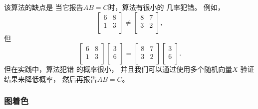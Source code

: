 该算法的缺点是
当它报告$AB=C$时，算法有很小的
几率犯错。
例如，
\[
 \begin{bmatrix}
  6 & 8 \\
  1 & 3 \\
 \end{bmatrix}
\neq
 \begin{bmatrix}
  8 & 7 \\
  3 & 2 \\
 \end{bmatrix},
\]
但
\[
 \begin{bmatrix}
  6 & 8 \\
  1 & 3 \\
 \end{bmatrix}
 \begin{bmatrix}
  3 \\
  6 \\
 \end{bmatrix}
=
 \begin{bmatrix}
  8 & 7 \\
  3 & 2 \\
 \end{bmatrix}
 \begin{bmatrix}
  3 \\
  6 \\
 \end{bmatrix}.
\]
但在实践中，算法犯错
的概率很小，
并且我们可以通过使用多个随机向量$X$
验证结果来降低概率，
然后再报告$AB=C$。

\subsubsection{图着色}


